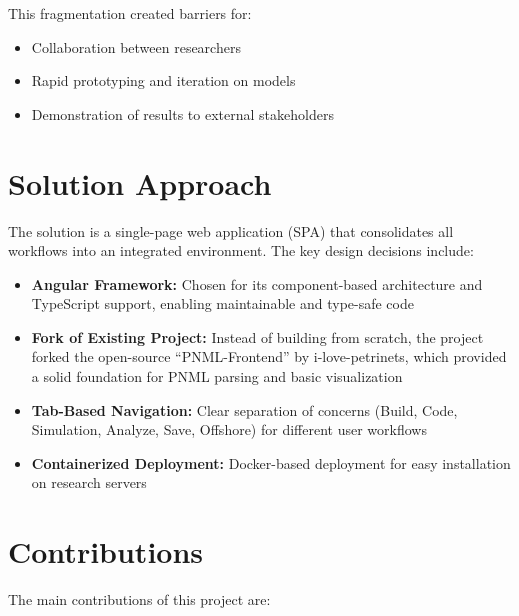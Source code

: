 This fragmentation created barriers for:
\begin{itemize}
    \item Collaboration between researchers
    \item Rapid prototyping and iteration on models
    \item Demonstration of results to external stakeholders
\end{itemize}

\section{Solution Approach}
\label{sec:solution-approach}

The solution is a single-page web application (SPA) that consolidates all workflows into an integrated environment. The key design decisions include:

\begin{itemize}
    \item \textbf{Angular Framework:} Chosen for its component-based architecture and TypeScript support, enabling maintainable and type-safe code
    \item \textbf{Fork of Existing Project:} Instead of building from scratch, the project forked the open-source ``PNML-Frontend'' by i-love-petrinets, which provided a solid foundation for PNML parsing and basic visualization
    \item \textbf{Tab-Based Navigation:} Clear separation of concerns (Build, Code, Simulation, Analyze, Save, Offshore) for different user workflows
    \item \textbf{Containerized Deployment:} Docker-based deployment for easy installation on research servers
\end{itemize}

\section{Contributions}
\label{sec:contributions}

The main contributions of this project are:

